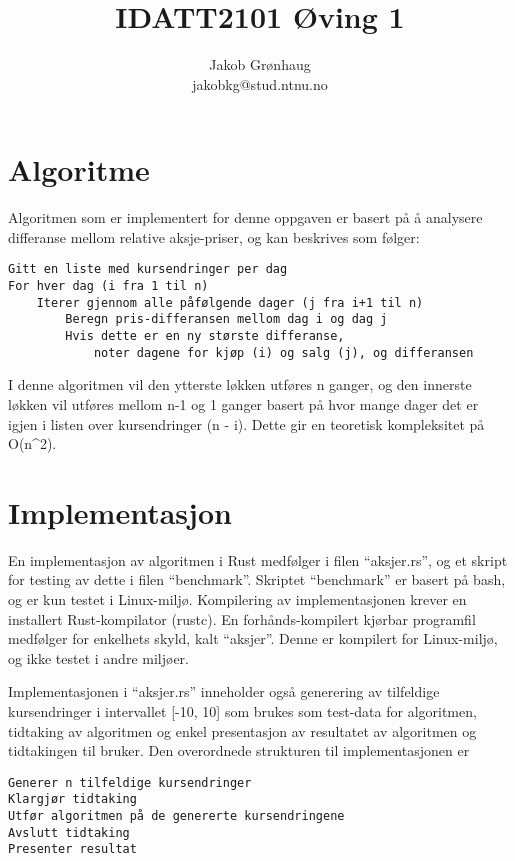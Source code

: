 \title{IDATT2101 Øving 1}

\author {
    Jakob Grønhaug \\
    jakobkg@stud.ntnu.no}

\hypertarget{algoritme}{%
\section{Algoritme}\label{algoritme}}

Algoritmen som er implementert for denne oppgaven er basert på å
analysere differanse mellom relative aksje-priser, og kan beskrives som
følger:

\begin{verbatim}
Gitt en liste med kursendringer per dag
For hver dag (i fra 1 til n)
    Iterer gjennom alle påfølgende dager (j fra i+1 til n)
        Beregn pris-differansen mellom dag i og dag j
        Hvis dette er en ny største differanse,
            noter dagene for kjøp (i) og salg (j), og differansen
\end{verbatim}

I denne algoritmen vil den ytterste løkken utføres n ganger, og den
innerste løkken vil utføres mellom n-1 og 1 ganger basert på hvor mange
dager det er igjen i listen over kursendringer (n - i). Dette gir en
teoretisk kompleksitet på O(n\^{}2).

\hypertarget{implementasjon}{%
\section{Implementasjon}\label{implementasjon}}

En implementasjon av algoritmen i Rust medfølger i filen ``aksjer.rs'',
og et skript for testing av dette i filen ``benchmark''. Skriptet
``benchmark'' er basert på bash, og er kun testet i Linux-miljø.
Kompilering av implementasjonen krever en installert Rust-kompilator
(rustc). En forhånds-kompilert kjørbar programfil medfølger for
enkelhets skyld, kalt ``aksjer''. Denne er kompilert for Linux-miljø, og
ikke testet i andre miljøer.

Implementasjonen i ``aksjer.rs'' inneholder også generering av
tilfeldige kursendringer i intervallet {[}-10, 10{]} som brukes som
test-data for algoritmen, tidtaking av algoritmen og enkel presentasjon
av resultatet av algoritmen og tidtakingen til bruker. Den overordnede
strukturen til implementasjonen er

\begin{verbatim}
Generer n tilfeldige kursendringer
Klargjør tidtaking
Utfør algoritmen på de genererte kursendringene
Avslutt tidtaking
Presenter resultat
\end{verbatim}

